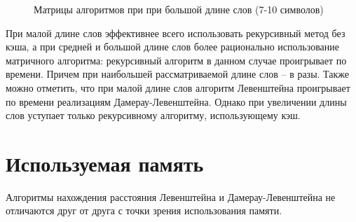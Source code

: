 \begin{figure}[h!]
	\caption{Матрицы алгоритмов при при большой длине слов (7-10 символов)}
	\label{fig:кенгуру_матрица}
\end{figure}

При малой длине слов эффективнее всего использовать рекурсивный метод без кэша, а при средней и большой длине слов более рационально использование матричного алгоритма: рекурсивный алгоритм в данном случае проигрывает по времени. Причем при наибольшей рассматриваемой длине слов -- в разы. Также можно отметить, что при малой длине слов алгоритм Левенштейна проигрывает по времени реализациям Дамерау-Левенштейна. Однако при увеличении длины слов уступает только рекурсивному алгоритму, использующему кэш. 


\section{Используемая память}

Алгоритмы нахождения расстояния Левенштейна и Дамерау-Левенштейна не отличаются друг от друга с точки зрения использования памяти.

